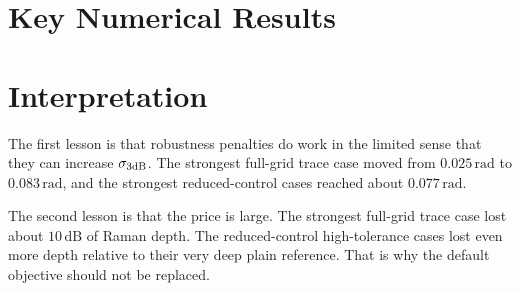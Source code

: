 \documentclass[11pt]{article}
\begin{document}
\section{Key Numerical Results}

\begin{table}[H]
\centering
\small
{}
\caption{Representative numerical results from the sharpness/robustness sweep.
The table keeps only the comparison points needed to interpret the tradeoff;
the full sweep contained \(26\) successful records.}
\end{table}

\section{Interpretation}

The first lesson is that robustness penalties do work in the limited sense that
they can increase \(\sigma_{3\mathrm{dB}}\). The strongest full-grid trace case moved
from \(0.025\,\mathrm{rad}\) to \(0.083\,\mathrm{rad}\), and the strongest
reduced-control cases reached about \(0.077\,\mathrm{rad}\).

The second lesson is that the price is large. The strongest full-grid trace
case lost about \(10\,\mathrm{dB}\) of Raman depth. The reduced-control
high-tolerance cases lost even more depth relative to their very deep plain
reference. That is why the default objective should not be replaced.
\end{document}
